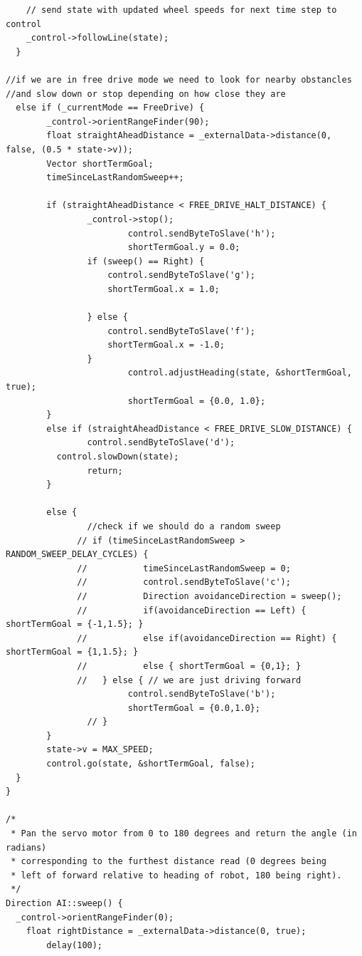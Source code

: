 \documentclass[paper=a4, fontsize=11pt]{scrartcl}
\numberwithin{equation}{section}		%
\numberwithin{figure}{section}			%
\numberwithin{table}{section}				%
\begin{document}
{\begin{verbatim}
    // send state with updated wheel speeds for next time step to control
   	_control->followLine(state);
  }

//if we are in free drive mode we need to look for nearby obstancles
//and slow down or stop depending on how close they are
  else if (_currentMode == FreeDrive) {
        _control->orientRangeFinder(90);
        float straightAheadDistance = _externalData->distance(0, false, (0.5 * state->v));
        Vector shortTermGoal;
        timeSinceLastRandomSweep++;
        
        if (straightAheadDistance < FREE_DRIVE_HALT_DISTANCE) {
    			_control->stop();
                        control.sendByteToSlave('h');
                        shortTermGoal.y = 0.0;
    			if (sweep() == Right) {
    				control.sendByteToSlave('g');
    				shortTermGoal.x = 1.0;

    			} else {
    				control.sendByteToSlave('f');
    				shortTermGoal.x = -1.0;
    			}
                        control.adjustHeading(state, &shortTermGoal, true);
                        shortTermGoal = {0.0, 1.0};
        }
        else if (straightAheadDistance < FREE_DRIVE_SLOW_DISTANCE) {
    			control.sendByteToSlave('d');
          control.slowDown(state);
    			return;
        }
        
        else {
                //check if we should do a random sweep
              // if (timeSinceLastRandomSweep > RANDOM_SWEEP_DELAY_CYCLES) {
              //           timeSinceLastRandomSweep = 0;
              //           control.sendByteToSlave('c');
              //           Direction avoidanceDirection = sweep();
              //           if(avoidanceDirection == Left) { shortTermGoal = {-1,1.5}; }
              //           else if(avoidanceDirection == Right) { shortTermGoal = {1,1.5}; }
              //           else { shortTermGoal = {0,1}; }
              //   } else { // we are just driving forward
            	        control.sendByteToSlave('b');
                        shortTermGoal = {0.0,1.0}; 
                // }
        }	
        state->v = MAX_SPEED;
        control.go(state, &shortTermGoal, false);
  }
}

/*
 * Pan the servo motor from 0 to 180 degrees and return the angle (in radians)
 * corresponding to the furthest distance read (0 degrees being 
 * left of forward relative to heading of robot, 180 being right).
 */
Direction AI::sweep() {
  _control->orientRangeFinder(0);
	float rightDistance = _externalData->distance(0, true);
        delay(100);
	

\end{verbatim}}
\end{document}
